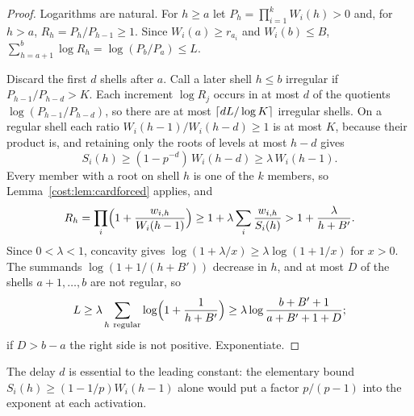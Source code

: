 \begin{proof}
Logarithms are natural. For $h\ge a$ let $P_h=\prod_{i=1}^kW_i(h)>0$ and, for $h>a$,
$R_h=P_h/P_{h-1}\ge1$. Since $W_i(a)\ge r_{a_i}$ and $W_i(b)\le B$,
$\sum_{h=a+1}^b\log R_h=\log(P_b/P_a)\le L$.

Discard the first $d$ shells after $a$. Call a later shell $h\le b$ irregular if
$P_{h-1}/P_{h-d}>K$. Each increment $\log R_j$ occurs in at most $d$ of the quotients
$\log(P_{h-1}/P_{h-d})$, so there are at most $\lceil dL/\log K\rceil$ irregular shells. On a
regular shell each ratio $W_i(h-1)/W_i(h-d)\ge1$ is at most $K$, because their product is,
and retaining only the roots of levels at most $h-d$ gives
\[
 S_i(h)\ge(1-p^{-d})\,W_i(h-d)\ge\lambda\,W_i(h-1).
\]
Every member with a root on shell $h$ is one of the $k$ members, so
Lemma~\ref{cost:lem:cardforced} applies, and
\[
 R_h=\prod_i\Bigl(1+\frac{w_{i,h}}{W_i(h-1)}\Bigr)\ge1+\lambda\sum_i\frac{w_{i,h}}{S_i(h)}
 >1+\frac\lambda{h+B'} .
\]
Since $0<\lambda<1$, concavity gives $\log(1+\lambda/x)\ge\lambda\log(1+1/x)$ for $x>0$.
The summands $\log(1+1/(h+B'))$ decrease in $h$, and at most $D$ of the shells
$a+1,\dots,b$ are not regular, so
\[
 L\ge\lambda\sum_{h\ \mathrm{regular}}\log\Bigl(1+\frac1{h+B'}\Bigr)
 \ge\lambda\log\frac{b+B'+1}{a+B'+1+D};
\]
if $D>b-a$ the right side is not positive. Exponentiate.
\end{proof}

The delay $d$ is essential to the leading constant: the elementary bound
$S_i(h)\ge(1-1/p)W_i(h-1)$ alone would put a factor $p/(p-1)$ into the exponent at each
activation.

